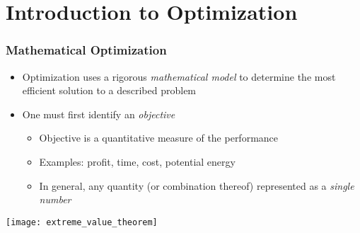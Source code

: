 \documentclass[%
  final,
  11pt, 
  show notes, %
  t, %
  fleqn, %
]{beamer}
\begin{document}
  
  
  
\section{Introduction to Optimization}

\begin{frame}[fragile]
  \frametitle{Mathematical Optimization}
\begin{itemize}
\item Optimization uses a rigorous \emph{mathematical model} to determine the most efficient solution to a described problem 
\item One must first identify an \emph{objective}
\begin{itemize}
\item Objective is a quantitative measure of the performance
\item Examples: profit, time, cost, potential energy
\item In general, any quantity (or combination thereof) represented as a \emph{single number}
\end{itemize}
\end{itemize}
\begin{center}
\texttt{[image: extreme\_value\_theorem]}
\end{center}
\end{frame}
\end{document}
